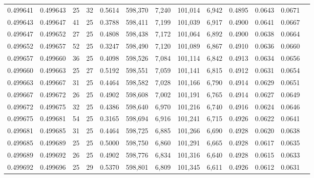 \begin{tabular}{rrrrrrrrrrrrr}
0.499641 & 0.499643 &    25 &  32 &                                     0.5614 & 598,370 &   7,240 & 101,014 &   6,942 & 0.4895 & 0.0643 & 0.0671 \\
0.499643 & 0.499647 &    41 &  25 &                                     0.3788 & 598,411 &   7,199 & 101,039 &   6,917 & 0.4900 & 0.0641 & 0.0667 \\
0.499647 & 0.499652 &    27 &  25 &                                     0.4808 & 598,438 &   7,172 & 101,064 &   6,892 & 0.4900 & 0.0638 & 0.0664 \\
0.499652 & 0.499657 &    52 &  25 &                                     0.3247 & 598,490 &   7,120 & 101,089 &   6,867 & 0.4910 & 0.0636 & 0.0660 \\
0.499657 & 0.499660 &    36 &  25 &                                     0.4098 & 598,526 &   7,084 & 101,114 &   6,842 & 0.4913 & 0.0634 & 0.0656 \\
0.499660 & 0.499663 &    25 &  27 &                                     0.5192 & 598,551 &   7,059 & 101,141 &   6,815 & 0.4912 & 0.0631 & 0.0654 \\
0.499663 & 0.499667 &    31 &  25 &                                     0.4464 & 598,582 &   7,028 & 101,166 &   6,790 & 0.4914 & 0.0629 & 0.0651 \\
0.499667 & 0.499672 &    26 &  25 &                                     0.4902 & 598,608 &   7,002 & 101,191 &   6,765 & 0.4914 & 0.0627 & 0.0649 \\
0.499672 & 0.499675 &    32 &  25 &                                     0.4386 & 598,640 &   6,970 & 101,216 &   6,740 & 0.4916 & 0.0624 & 0.0646 \\
0.499675 & 0.499681 &    54 &  25 &                                     0.3165 & 598,694 &   6,916 & 101,241 &   6,715 & 0.4926 & 0.0622 & 0.0641 \\
0.499681 & 0.499685 &    31 &  25 &                                     0.4464 & 598,725 &   6,885 & 101,266 &   6,690 & 0.4928 & 0.0620 & 0.0638 \\
0.499685 & 0.499689 &    25 &  25 &                                     0.5000 & 598,750 &   6,860 & 101,291 &   6,665 & 0.4928 & 0.0617 & 0.0635 \\
0.499689 & 0.499692 &    26 &  25 &                                     0.4902 & 598,776 &   6,834 & 101,316 &   6,640 & 0.4928 & 0.0615 & 0.0633 \\
0.499692 & 0.499696 &    25 &  29 &                                     0.5370 & 598,801 &   6,809 & 101,345 &   6,611 & 0.4926 & 0.0612 & 0.0631 \\

\end{tabular}
